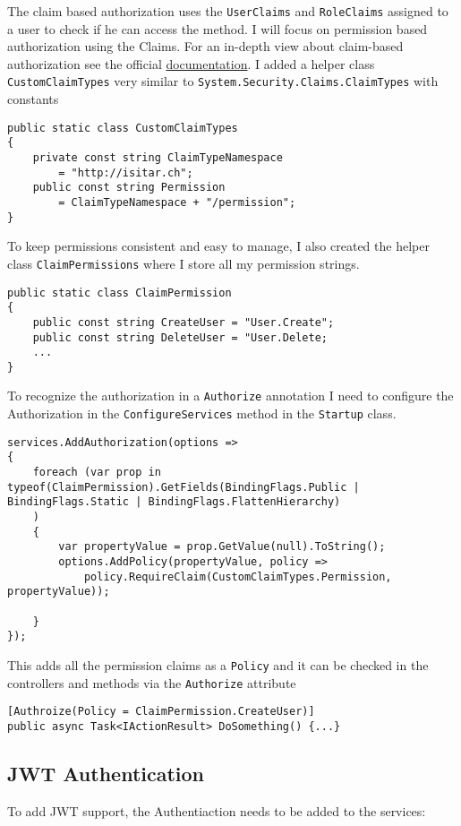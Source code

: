 \documentclass[12pt, a4paper]{article}
\begin{document}
The claim based authorization uses the \lstinline|UserClaims| and \lstinline|RoleClaims| assigned to a user to check if he can access the method.  I will focus on permission based authorization using the Claims. For an in-depth view about claim-based authorization see the official  \href{https://docs.microsoft.com/en-us/aspnet/core/security/authorization/claims}{documentation}.
I added a helper class \lstinline|CustomClaimTypes| very similar to \lstinline|System.Security.Claims.ClaimTypes| with constants
\begin{lstlisting}
public static class CustomClaimTypes
{
	private const string ClaimTypeNamespace 
		= "http://isitar.ch";
	public const string Permission 
		= ClaimTypeNamespace + "/permission";
}
\end{lstlisting}
To keep permissions consistent and easy to manage, I also created the helper class \lstinline|ClaimPermissions| where I store all my permission strings.
\begin{lstlisting}
public static class ClaimPermission
{
	public const string CreateUser = "User.Create";
	public const string DeleteUser = "User.Delete;
	...
}
\end{lstlisting}
To recognize the authorization in a \lstinline|Authorize| annotation I need to configure the Authorization in the \lstinline|ConfigureServices| method in the \lstinline|Startup| class.
\begin{lstlisting}
services.AddAuthorization(options =>
{
	foreach (var prop in typeof(ClaimPermission).GetFields(BindingFlags.Public | BindingFlags.Static | BindingFlags.FlattenHierarchy)
	)
	{
		var propertyValue = prop.GetValue(null).ToString();
		options.AddPolicy(propertyValue, policy => 
			policy.RequireClaim(CustomClaimTypes.Permission, propertyValue));

	}
});
\end{lstlisting}
This adds all the permission claims as a \lstinline|Policy| and it can be checked in the controllers and methods via the \lstinline|Authorize| attribute
\begin{lstlisting}
[Authroize(Policy = ClaimPermission.CreateUser)]
public async Task<IActionResult> DoSomething() {...}
\end{lstlisting}

\subsection{JWT Authentication}
To add JWT support, the Authentiaction needs to be added to the services:
\end{document}
